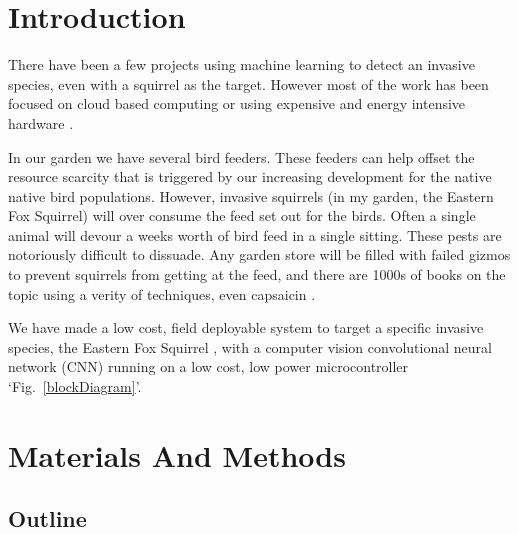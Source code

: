 \documentclass[conference]{IEEEtran}
\begin{document}

\section{Introduction}
There have been a few projects using machine learning to detect an invasive species, even with a squirrel as the target. However most of the work has been focused on cloud based computing  \cite{mary} or using expensive and energy intensive hardware \cite{king}.

In our garden we have several bird feeders. These feeders can help offset the resource scarcity that is triggered by our increasing development for the native native bird populations. However, invasive squirrels (in my garden, the Eastern Fox Squirrel) will over consume the feed set out for the birds. Often a single animal will devour a weeks worth of bird feed in a single sitting. These pests are notoriously difficult to dissuade. Any garden store will be filled with failed gizmos to prevent squirrels from getting at the feed, and there are 1000s of books on the topic using a verity of techniques, even capsaicin  \cite{chap}.

We have made a low cost, field deployable system to target a specific invasive species, the Eastern Fox Squirrel \cite{krause}, with a computer vision convolutional neural network (CNN) running on a low cost, low power microcontroller `Fig.~\ref{blockDiagram}'.

\section{Materials And Methods}

\subsection{Outline}
\end{document}
